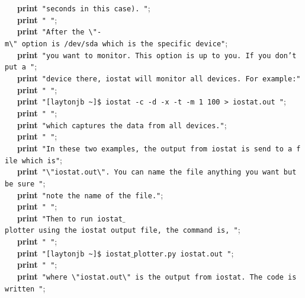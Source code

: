 \mbox{}\ \ \ \textbf{print}\ \texttt{"{}seconds\ in\ this\ case).\ "{}}; \\
\mbox{}\ \ \ \textbf{print}\ \texttt{"{}\ "{}}; \\
\mbox{}\ \ \ \textbf{print}\ \texttt{"{}After\ the\ \textbackslash{}"{}-m\textbackslash{}"{}\ option\ is\ /dev/sda\ which\ is\ the\ specific\ device"{}}; \\
\mbox{}\ \ \ \textbf{print}\ \texttt{"{}you\ want\ to\ monitor.\ This\ option\ is\ up\ to\ you.\ If\ you\ don't\ put\ a\ "{}}; \\
\mbox{}\ \ \ \textbf{print}\ \texttt{"{}device\ there,\ iostat\ will\ monitor\ all\ devices.\ For\ example:"{}} \\
\mbox{}\ \ \ \textbf{print}\ \texttt{"{}\ "{}}; \\
\mbox{}\ \ \ \textbf{print}\ \texttt{"{}[laytonjb\ \textasciitilde{}]\$\ iostat\ -c\ -d\ -x\ -t\ -m\ 1\ 100\ \textgreater{}\ iostat.out\ "{}}; \\
\mbox{}\ \ \ \textbf{print}\ \texttt{"{}\ "{}}; \\
\mbox{}\ \ \ \textbf{print}\ \texttt{"{}which\ captures\ the\ data\ from\ all\ devices."{}}; \\
\mbox{}\ \ \ \textbf{print}\ \texttt{"{}\ "{}}; \\
\mbox{}\ \ \ \textbf{print}\ \texttt{"{}In\ these\ two\ examples,\ the\ output\ from\ iostat\ is\ send\ to\ a\ file\ which\ is"{}}; \\
\mbox{}\ \ \ \textbf{print}\ \texttt{"{}\textbackslash{}"{}iostat.out\textbackslash{}"{}.\ You\ can\ name\ the\ file\ anything\ you\ want\ but\ be\ sure\ "{}}; \\
\mbox{}\ \ \ \textbf{print}\ \texttt{"{}note\ the\ name\ of\ the\ file."{}}; \\
\mbox{}\ \ \ \textbf{print}\ \texttt{"{}\ "{}}; \\
\mbox{}\ \ \ \textbf{print}\ \texttt{"{}Then\ to\ run\ iostat$\_$plotter\ using\ the\ iostat\ output\ file,\ the\ command\ is,\ "{}}; \\
\mbox{}\ \ \ \textbf{print}\ \texttt{"{}\ "{}}; \\
\mbox{}\ \ \ \textbf{print}\ \texttt{"{}[laytonjb\ \textasciitilde{}]\$\ iostat$\_$plotter.py\ iostat.out\ "{}}; \\
\mbox{}\ \ \ \textbf{print}\ \texttt{"{}\ "{}}; \\
\mbox{}\ \ \ \textbf{print}\ \texttt{"{}where\ \textbackslash{}"{}iostat.out\textbackslash{}"{}\ is\ the\ output\ from\ iostat.\ The\ code\ is\ written\ "{}}; \\
